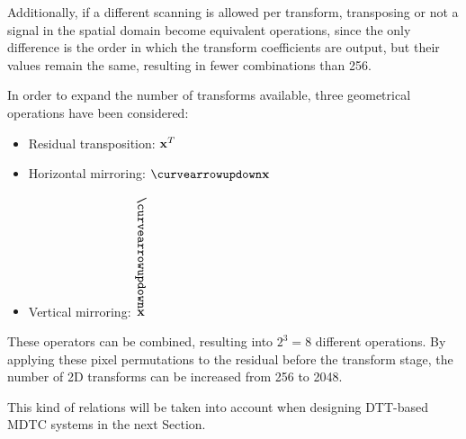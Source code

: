\documentclass[11pt,a4paper,openright,twoside]{book}
\numberwithin{equation}{section} %
\numberwithin{figure}{section} %
\numberwithin{table}{section} %
\begin{document}
Additionally, if a different scanning is allowed per transform, transposing or
not a signal in the spatial domain become equivalent operations, since the
only difference is the order in which the transform coefficients are output,
but their values remain the same, resulting in fewer combinations than 256.

In order to expand the number of transforms available, three geometrical
operations have been considered:
\begin{itemize}
	\item Residual transposition: $\mathbf{x}^T$
	\item Horizontal mirroring: $\curvearrowupdown\x$
	\item Vertical mirroring: $\overset{{\rotatebox[origin=c]{-90}{\curvearrowupdown}}}{\x}$
\end{itemize}
These operators can be combined, resulting into $2^3=8$ different operations.
By applying these pixel permutations to the residual before the transform
stage, the number of 2D transforms can be increased from 256 to 2048.

This kind of relations will be taken into account when designing
\acs{DTT}-based \acs{MDTC} systems in the next Section.
\end{document}
